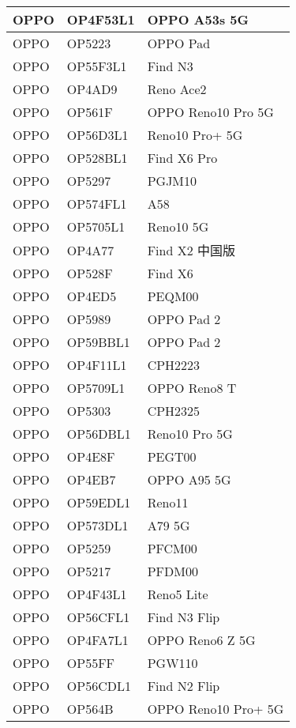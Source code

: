 \begin{tabularx}{\linewidth}{|l|X|X|}
        OPPO & OP4F53L1 & OPPO A53s 5G \\ \hline
        OPPO & OP5223 & OPPO Pad \\ \hline
        OPPO & OP55F3L1 & Find N3 \\ \hline
        OPPO & OP4AD9 & Reno Ace2 \\ \hline
        OPPO & OP561F & OPPO Reno10 Pro 5G \\ \hline
        OPPO & OP56D3L1 & Reno10 Pro+ 5G \\ \hline
        OPPO & OP528BL1 & Find X6 Pro \\ \hline
        OPPO & OP5297 & PGJM10 \\ \hline
        OPPO & OP574FL1 & A58 \\ \hline
        OPPO & OP5705L1 & Reno10 5G \\ \hline
        OPPO & OP4A77 & Find X2 中国版 \\ \hline
        OPPO & OP528F & Find X6 \\ \hline
        OPPO & OP4ED5 & PEQM00 \\ \hline
        OPPO & OP5989 & OPPO Pad 2 \\ \hline
        OPPO & OP59BBL1 & OPPO Pad 2 \\ \hline
        OPPO & OP4F11L1 & CPH2223 \\ \hline
        OPPO & OP5709L1 & OPPO Reno8 T \\ \hline
        OPPO & OP5303 & CPH2325 \\ \hline
        OPPO & OP56DBL1 & Reno10 Pro 5G \\ \hline
        OPPO & OP4E8F & PEGT00 \\ \hline
        OPPO & OP4EB7 & OPPO A95 5G \\ \hline
        OPPO & OP59EDL1 & Reno11 \\ \hline
        OPPO & OP573DL1 & A79 5G \\ \hline
        OPPO & OP5259 & PFCM00 \\ \hline
        OPPO & OP5217 & PFDM00 \\ \hline
        OPPO & OP4F43L1 & Reno5 Lite \\ \hline
        OPPO & OP56CFL1 & Find N3 Flip \\ \hline
        OPPO & OP4FA7L1 & OPPO Reno6 Z 5G \\ \hline
        OPPO & OP55FF & PGW110 \\ \hline
        OPPO & OP56CDL1 & Find N2 Flip \\ \hline
        OPPO & OP564B & OPPO Reno10 Pro+ 5G \\ \hline

\end{tabularx}
